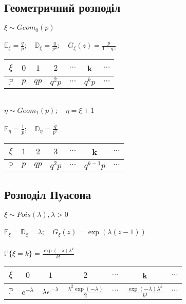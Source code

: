 \documentclass[16pt]{scrartcl}
\begin{document}
\subsection{Геометричний розподіл}
$\xi\sim Geom_0(p)$\\\\
$\mathbb{E}_\xi=\frac{q}{p};\quad\mathbb{D}_\xi=\frac{q}{p^2};\quad G_\xi(z)=\frac{p}{1-q z}$
\begin{table}[h]
    \begin{tabular}{c|c|c|c|c|c|c}
        $\xi$ & $0$ & $1$ & $2$ & $\cdots$ & k & $\cdots$ \\\hline
        $\mathbb{P}$ & $p$ & $q p$ & $q^2 p$ & $\cdots$ & $q^k p$ & $\cdots$
    \end{tabular}
    \label{tab:my_label}
\end{table}\\
$\eta\sim Geom_1(p);\quad\eta=\xi+1$\\\\
$\mathbb{E}_\eta=\frac{1}{p};\quad\mathbb{D}_\eta=\frac{q}{p^2}$
\begin{table}[h]
    \begin{tabular}{c|c|c|c|c|c|c}
        $\xi$ & $1$ & $2$ & $3$ & $\cdots$ & k & $\cdots$ \\\hline
        $\mathbb{P}$ & $p$ & $q p$ & $q^2 p$ & $\cdots$ & $q^{k-1} p$ & $\cdots$
    \end{tabular}
    \label{tab:my_label}
\end{table}
\newpage

\subsection{Розподіл Пуасона}
$\xi\sim Pois(\lambda), \lambda > 0$\\\\
$\mathbb{E}_\xi=\mathbb{D}_\xi=\lambda;\quad G_\xi(z)=\exp{(\lambda(z-1))}$\\\\
$\mathbb{P}\{\xi=k\}=\frac{\exp{(-\lambda)}\lambda^k}{k!}$
\begin{table}[h]
    \begin{tabular}{c|c|c|c|c|c|c}
        $\xi$ & $0$ & $1$ & $2$ & $\cdots$ & k & $\cdots$ \\\hline
        $\mathbb{P}$ & $e^{-\lambda}$ & $\lambda e^{-\lambda}$ & $\frac{\lambda^2\exp{(-\lambda)}}{2}$ & $\cdots$ & $\frac{\exp{(-\lambda)}\lambda^k}{k!}$ & $\cdots$
    \end{tabular}
    \label{tab:my_label}
\end{table}
\end{document}

